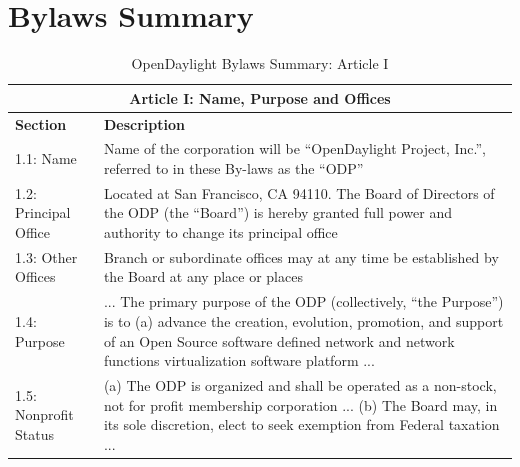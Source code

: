 \documentclass[a4paper, 12pt]{book}
\begin{document}
\chapter{Bylaws Summary}
\label{chap:appendix_bylaws}
\begin{table}[H]
  \begin{center}
    \begin{tabular}{ | p{4cm} | p{11cm} | }
    \toprule
    \multicolumn {2}{|c|}{\textbf{Article I: Name, Purpose and Offices}} \\
    \hline
    \textbf{Section} & \textbf{Description} \\
    \hline
    1.1: Name & Name of the corporation will be “OpenDaylight Project, Inc.”, referred to in these By-laws as the “ODP” \\
    \hline
    1.2: Principal Office & Located at San Francisco, CA 94110.  The Board of Directors of the ODP (the “Board”) is hereby granted full power and authority to change its principal office \\
    \hline
    1.3: Other Offices & Branch or subordinate offices may at any time be established by the Board at any place or places \\
    \hline
    1.4: Purpose & ... The primary purpose of the ODP (collectively, “the Purpose”) is to (a) advance the creation, evolution, promotion, and support of an Open Source software defined network and network functions virtualization software platform ... \\
    \hline
    1.5: Nonprofit Status & (a) The ODP is organized and shall be operated as a non-stock, not for profit membership corporation ... (b) The Board may, in its sole discretion, elect to seek exemption from Federal taxation ...\\
    \bottomrule
    \end{tabular}
    \caption{OpenDaylight Bylaws Summary: Article I}
    \label{tab:odlbylaws-art01}
  \end{center}
\end{table}
\end{document}
